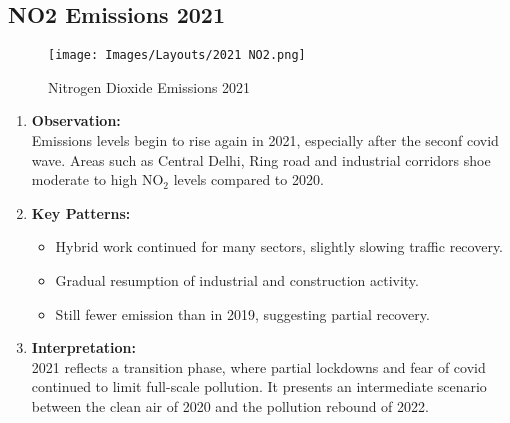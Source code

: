 \documentclass[12pt]{report}
\begin{document}
\subsection{NO2 Emissions 2021}
\begin{figure}[H]
    \centering
    \texttt{[image: Images/Layouts/2021 NO2.png]}
    \caption{Nitrogen Dioxide Emissions 2021}
\end{figure}
\begin{enumerate}
    \item \textbf{Observation:}\\
    Emissions levels begin to rise again in 2021, especially after the seconf covid wave. Areas such as Central Delhi, Ring road and industrial corridors shoe moderate to high NO$_2$ levels compared to 2020.
    \item \textbf{Key Patterns:}
    \begin{itemize}
        \item Hybrid work continued for many sectors, slightly slowing traffic recovery.
        \item Gradual resumption of industrial and construction activity.
        \item Still fewer emission than in 2019, suggesting partial recovery.
    \end{itemize}
    \item \textbf{Interpretation:}\\
    2021 reflects a transition phase, where partial lockdowns and fear of covid continued to limit full-scale pollution. It presents an intermediate scenario between the clean air of 2020 and the pollution rebound of 2022.
\end{enumerate}
\end{document}
